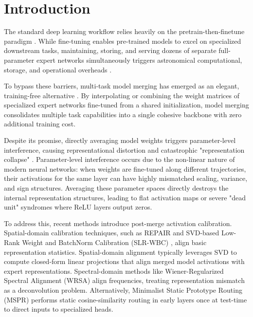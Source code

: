 \documentclass{article}
\theoremstyle{plain}
\theoremstyle{definition}
\theoremstyle{remark}
\begin{document}
\section{Introduction}
\label{sec:intro}
The standard deep learning workflow relies heavily on the pretrain-then-finetune paradigm \cite{he2016deep, vaswani2017attention, devlin2018bert, brown2020language}. While fine-tuning enables pre-trained models to excel on specialized downstream tasks, maintaining, storing, and serving dozens of separate full-parameter expert networks simultaneously triggers astronomical computational, storage, and operational overheads \cite{caruana1997multitask, ruder2017overview, collobert2008unified}.

To bypass these barriers, multi-task model merging has emerged as an elegant, training-free alternative \cite{wortsman2022model, ilharco2022editing}. By interpolating or combining the weight matrices of specialized expert networks fine-tuned from a shared initialization, model merging consolidates multiple task capabilities into a single cohesive backbone with zero additional training cost. 

Despite its promise, directly averaging model weights triggers parameter-level interference, causing representational distortion and catastrophic "representation collapse" \cite{jordan2023repair}. Parameter-level interference occurs due to the non-linear nature of modern neural networks: when weights are fine-tuned along different trajectories, their activations for the same layer can have highly mismatched scaling, variance, and sign structures. Averaging these parameter spaces directly destroys the internal representation structures, leading to flat activation maps or severe "dead unit" syndromes where ReLU layers output zeros.

To address this, recent methods introduce post-merge activation calibration. Spatial-domain calibration techniques, such as REPAIR \cite{jordan2023repair} and SVD-based Low-Rank Weight and BatchNorm Calibration (SLR-WBC) \cite{anonymous2026slrwbc}, align basic representation statistics. Spatial-domain alignment typically leverages SVD to compute closed-form linear projections that align merged model activations with expert representations. Spectral-domain methods like Wiener-Regularized Spectral Alignment (WRSA) \cite{anonymous2026wrsa} align frequencies, treating representation mismatch as a deconvolution problem. Alternatively, Minimalist Static Prototype Routing (MSPR) \cite{anonymous2026mspr} performs static cosine-similarity routing in early layers once at test-time to direct inputs to specialized heads.
\end{document}
